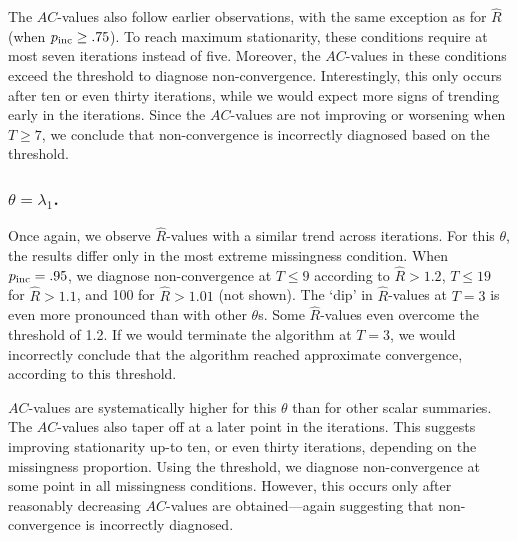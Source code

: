 \documentclass[Royal,times,sageh]{sagej}
\begin{document}
The \(AC\)-values also follow earlier observations, with the same exception as for \(\widehat{R}\) (when \(p_{\rm inc}\geq.75\)). To reach maximum stationarity, these conditions require at most seven iterations instead of five. Moreover, the \(AC\)-values in these conditions exceed the threshold to diagnose non-convergence. Interestingly, this only occurs after ten or even thirty iterations, while we would expect more signs of trending early in the iterations. Since the \(AC\)-values are not improving or worsening when \(T\geq7\), we conclude that non-convergence is incorrectly diagnosed based on the threshold.

\hypertarget{thetalambda_1.}{%
\subsubsection{\texorpdfstring{\(\theta=\lambda_{1}\).}{\textbackslash theta=\textbackslash lambda\_\{1\}.}}\label{thetalambda_1.}}

Once again, we observe \(\widehat{R}\)-values with a similar trend across iterations. For this \(\theta\), the results differ only in the most extreme missingness condition. When \(p_{\rm inc}=.95\), we diagnose non-convergence at \(T\leq9\) according to \(\widehat{R}>1.2\), \(T\leq19\) for \(\widehat{R}>1.1\), and 100 for \(\widehat{R}>1.01\) (not shown). The `dip' in \(\widehat{R}\)-values at \(T=3\) is even more pronounced than with other \(\theta\)s. Some \(\widehat{R}\)-values even overcome the threshold of 1.2. If we would terminate the algorithm at \(T=3\), we would incorrectly conclude that the algorithm reached approximate convergence, according to this threshold.

\(AC\)-values are systematically higher for this \(\theta\) than for other scalar summaries. The \(AC\)-values also taper off at a later point in the iterations. This suggests improving stationarity up-to ten, or even thirty iterations, depending on the missingness proportion. Using the threshold, we diagnose non-convergence at some point in all missingness conditions. However, this occurs only after reasonably decreasing \(AC\)-values are obtained---again suggesting that non-convergence is incorrectly diagnosed.
\end{document}
